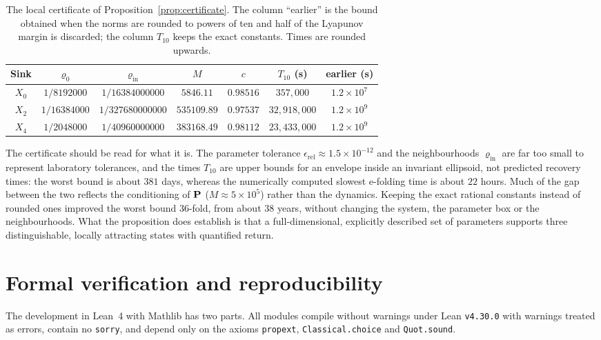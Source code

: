 \begin{table}[ht]
\centering
\caption{The local certificate of Proposition~\ref{prop:certificate}. The column ``earlier''
is the bound obtained when the norms are rounded to powers of ten and half of the Lyapunov
margin is discarded; the column \(T_{10}\) keeps the exact constants. Times are rounded
upwards.}\label{tab:certificate}
\begin{tabular}{ccccccc}
\toprule
Sink & \(\varrho_0\) & \(\varrho_{\mathrm{in}}\) & \(M\) & \(c\) & \(T_{10}\) (s) & earlier (s)\\
\midrule
\(X_0\) & \(1/8192000\) & \(1/16384000000\) & \(5846.11\) & \(0.98516\) & \(357{,}000\) & \(1.2\times10^{7}\)\\
\(X_2\) & \(1/16384000\) & \(1/327680000000\) & \(535109.89\) & \(0.97537\) & \(32{,}918{,}000\) & \(1.2\times10^{9}\)\\
\(X_4\) & \(1/2048000\) & \(1/40960000000\) & \(383168.49\) & \(0.98112\) & \(23{,}433{,}000\) & \(1.2\times10^{9}\)\\
\bottomrule
\end{tabular}
\end{table}

The certificate should be read for what it is. The parameter tolerance
\(\epsilon_{\mathrm{rel}}\approx1.5\times10^{-12}\) and the neighbourhoods
\(\varrho_{\mathrm{in}}\) are far too small to represent laboratory tolerances, and the times
\(T_{10}\) are upper bounds for an envelope inside an invariant ellipsoid, not predicted
recovery times: the worst bound is about \(381\) days, whereas the numerically computed slowest
e-folding time is about \(22\) hours. Much of the gap between the two reflects the conditioning of
\(\mathbf P\) (\(M\approx5\times10^5\)) rather than the dynamics. Keeping the exact rational
constants instead of rounded ones improved the worst bound \(36\)-fold, from about \(38\)
years, without changing the system, the parameter box or the neighbourhoods. What the
proposition does establish is that a full-dimensional, explicitly described set of parameters
supports three distinguishable, locally attracting states with quantified return.

\section{Formal verification and reproducibility}\label{sec:formal}
The development in Lean~4 \cite{Lean4} with Mathlib \cite{Mathlib} has two parts. All modules
compile without warnings under Lean \texttt{v4.30.0} with warnings treated as errors, contain no
\texttt{sorry}, and depend only on the axioms \texttt{propext}, \texttt{Classical.choice} and
\texttt{Quot.sound}.

